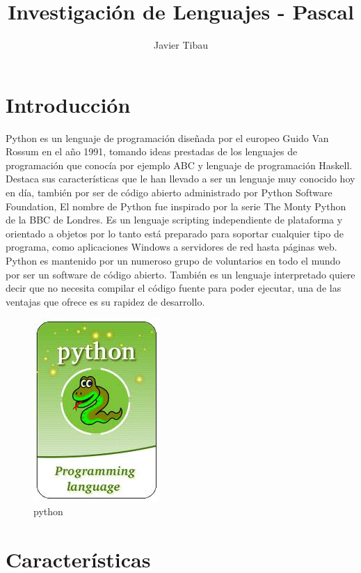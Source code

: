 \documentclass[11pt]{article} %
\title{Investigación de Lenguajes - Pascal}
\author{Javier Tibau}
\begin{document}
\maketitle

\section{Introducción}
Python es un lenguaje de programación diseñada por el europeo Guido Van Rossum en el año 1991, tomando ideas prestadas de los lenguajes de programación que conocía por ejemplo ABC y lenguaje de programación Haskell.
Destaca sus características que le han llevado a ser un lenguaje muy conocido hoy en día, también por ser de código abierto administrado por Python Software Foundation, El nombre de Python fue inspirado por la serie The Monty Python de la BBC de Londres.
Es un lenguaje scripting independiente de plataforma y orientado a objetos  por lo tanto está preparado para soportar cualquier tipo de programa, como aplicaciones Windows a servidores de red hasta páginas web.
Python es mantenido por un numeroso grupo de voluntarios en todo el mundo por ser un software de código abierto.  También es un lenguaje interpretado quiere decir que no necesita compilar el código fuente para poder ejecutar, una de las ventajas que ofrece es su rapidez de desarrollo.
\begin{figure}[htbp]
\begin{center}
\includegraphics[width=.30\textwidth]{./imagenes/pythonXD.jpg}
\caption{python}
\label{qt}
\end{center}
\end{figure}

\section{Características}
\end{document}

